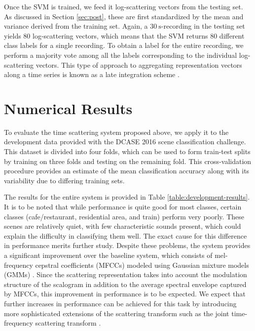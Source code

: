 \documentclass{article}
\begin{document}
\begin{sloppy}
Once the SVM is trained, we feed it log-scattering vectors from the testing set. As discussed in Section \ref{sec:post}, these are first standardized by the mean and variance derived from the training set. Again, a $30~\mathrm{s}$-recording in the testing set yields $80$ log-scattering vectors, which means that the SVM returns $80$ different class labels for a single recording. To obtain a label for the entire recording, we perform a majority vote among all the labels corresponding to the individual log-scattering vectors. This type of approach to aggregating representation vectors along a time series is known as a late integration scheme \cite{kittler}.

\section{Numerical Results}
\label{sec:results}

To evaluate the time scattering system proposed above, we apply it to the development data provided with the DCASE 2016 scene classification challenge. This dataset is divided into four folds, which can be used to form train-test splits by training on three folds and testing on the remaining fold. This cross-validation procedure provides an estimate of the mean classification accuracy along with its variability due to differing training sets.

The results for the entire system is provided in Table \ref{table:development-results}. It is to be noted that while performance is quite good for most classes, certain classes (\textsf{cafe/restaurant}, \textsf{residential area}, and \textsf{train}) perform very poorly. These scenes are relatively quiet, with few characteristic sounds present, which could explain the difficulty in classifying them well. The exact cause for this difference in performance merits further study. Despite these problems, the system provides a significant improvement over the baseline system, which consists of mel-frequency cepstral coefficients (MFCCs) modeled using Gaussian mixture models (GMMs) \cite{heittola}. Since the scattering representation takes into account the modulation structure of the scalogram in addition to the average spectral envelope captured by MFCCs, this improvement in performance is to be expected. We expect that further increases in performance can be achieved for this task by introducing more sophisticated extensions of the scattering transform such as the joint time-frequency scattering transform \cite{joint}.


\end{sloppy}
\end{document}
